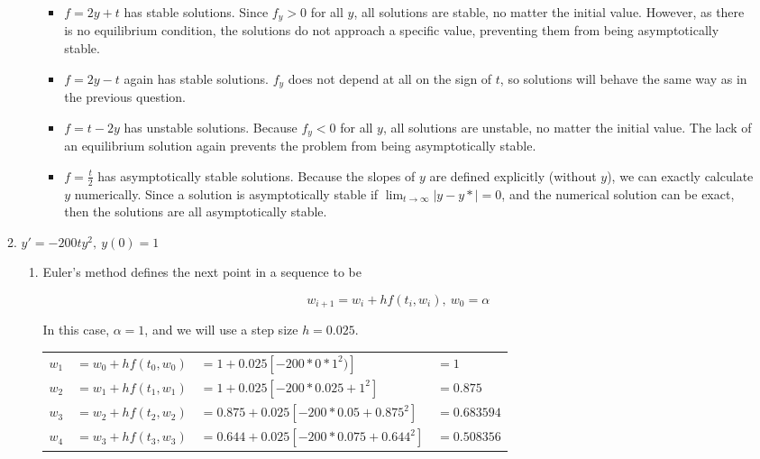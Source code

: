 \documentclass[11pt]{article}
\begin{document}
\begin{enumerate}
\begin{enumerate}
\begin{enumerate}
\begin{itemize}
				\item $f=2y+t$ has stable solutions. Since $f_y > 0$ for all $y$, all solutions are stable, no matter the initial value. However, as there is no equilibrium condition, the solutions do not approach a specific value, preventing them from being asymptotically stable.

				\medskip

				\item $f=2y-t$ again has stable solutions. $f_y$ does not depend at all on the sign of $t$, so solutions will behave the same way as in the previous question.

				\medskip

				\item $f=t-2y$ has unstable solutions. Because $f_y<0$ for all $y$, all solutions are unstable, no matter the initial value. The lack of an equilibrium solution again prevents the problem from being asymptotically stable.

				\medskip

				\item $f=\frac{t}{2}$ has asymptotically stable solutions. Because the slopes of $y$ are defined explicitly (without $y$), we can exactly calculate $y$ numerically. Since a solution is asymptotically stable if $\lim_{t\to\infty}|y-y*| = 0$, and the numerical solution can be exact, then the solutions are all asymptotically stable.

				\medskip

			\end{itemize}

		\end{enumerate}

		\item $y' = -200ty^2,\ y(0) = 1$

		\begin{enumerate}

			\item Euler's method defines the next point in a sequence to be

			\[
			w_{i+1} = w_i + hf(t_i,w_i),\ w_0 = \alpha
			\]

			In this case, $\alpha = 1$, and we will use a step size $h=0.025$.

			\medskip

			\begin{tabular}{llll}

			$w_1$ & $= w_0 + hf(t_0,w_0)$ & $= 1 + 0.025[-200*0*1^2)]$ &$=1$ \\
			$w_2$ & $= w_1 + hf(t_1,w_1)$ & $= 1 + 0.025[-200 * 0.025 + 1^2]$ & $=0.875$ \\
			$w_3$ & $= w_2 + hf(t_2,w_2)$ & $= 0.875 + 0.025[-200 * 0.05 + 0.875^2]$ & $=0.683594$ \\
			$w_4$ & $= w_3 + hf(t_3,w_3)$ & $= 0.644 + 0.025[-200*0.075 + 0.644^2]$ & $=0.508356$ \\


\end{tabular}
\end{enumerate}
\end{enumerate}
\end{enumerate}
\end{document}
